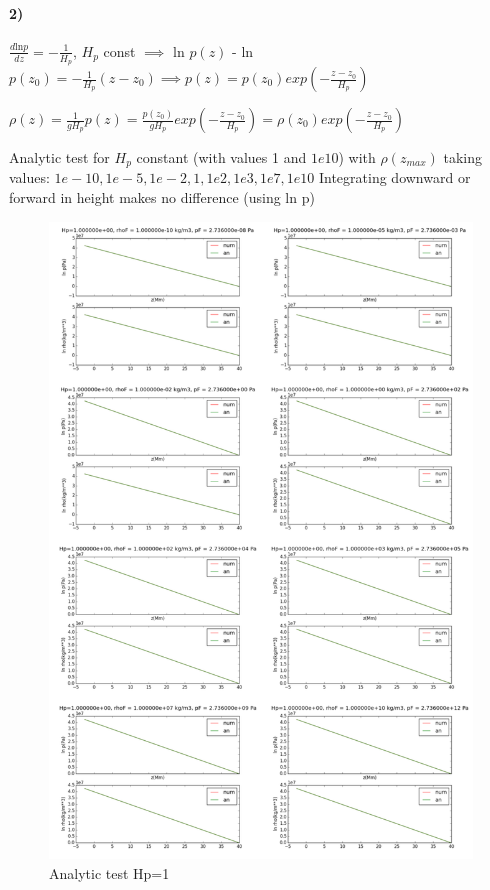 \documentclass[10pt]{book}
\begin{document}
\paragraph{2)}

$\frac{d \text{ln} p}{dz} = -\frac{1}{H_p}$, $H_p$ const $\implies$ ln $p(z)$ - ln $ p(z_0) = -\frac{1}{H_p}(z-z_0) \implies p(z) = p(z_0) exp(-\frac{z-z_0}{H_p})$  

$\rho(z) =  \frac{1}{g H_p}p(z) = \frac{p(z_0)}{g H_p} exp(-\frac{z-z_0}{H_p}) = \rho(z_0) exp(-\frac{z-z_0}{H_p})$ 

Analytic test for $H_p$ constant (with values 1 and $1e10$) with $\rho(z_{max})$ taking values: $1e-10, 1e-5, 1e-2,1, 1e2,1e3, 1e7, 1e10$
Integrating downward or forward in height makes no difference (using ln p)
\newpage 

\begin{figure}[!ht]
 \centering
 \includegraphics[scale=0.5]{allanalytic.png}
 \caption{Analytic test Hp=1}
\end{figure}
\end{document}
